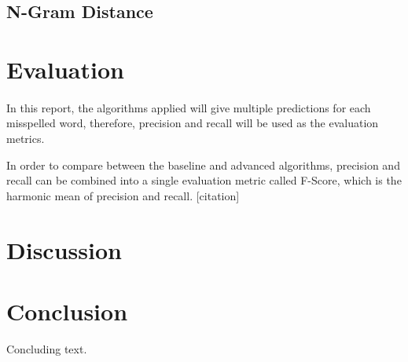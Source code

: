 \documentclass[11pt]{article}
\begin{document}
 
\subsection{N-Gram Distance}

\section{Evaluation}

\paragraph{} In this report, the algorithms applied will give multiple predictions for each misspelled word, therefore, precision and recall will be used as the evaluation metrics.

In order to compare between the baseline and advanced algorithms, precision and recall can be combined into a single evaluation metric called F-Score, which is the harmonic mean of precision and recall. [citation]

\section{Discussion}


\section{Conclusion}

Concluding text.



\end{document}
